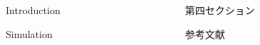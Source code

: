 \begin{frame}[t]{}
	
	\vspace{-10mm}
	\begin{columns}[T]
		\begin{column}{.49\linewidth}
			\begin{block}{Introduction}
				
			\end{block}
			\begin{block}{Simulation}
				
			\end{block}
			\end{column}

			\begin{column}{.49\linewidth}
			\begin{block}{第四セクション}
			\end{block}
			\begin{block}{参考文献}
				
			\end{block}
		\end{column}
	\end{columns}
\end{frame}